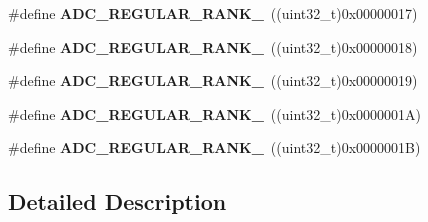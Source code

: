 \begin{DoxyCompactItemize}
\item 
\hypertarget{group___a_d_c__regular__rank_ga84301d64365a81385eec93a54a1b9c53}{\#define {\bfseries A\-D\-C\-\_\-\-R\-E\-G\-U\-L\-A\-R\-\_\-\-R\-A\-N\-K\-\_}~((uint32\-\_\-t)0x00000017)}\label{group___a_d_c__regular__rank_ga84301d64365a81385eec93a54a1b9c53}

\item 
\hypertarget{group___a_d_c__regular__rank_ga51119cb24537026fba397b0ba6a79a88}{\#define {\bfseries A\-D\-C\-\_\-\-R\-E\-G\-U\-L\-A\-R\-\_\-\-R\-A\-N\-K\-\_}~((uint32\-\_\-t)0x00000018)}\label{group___a_d_c__regular__rank_ga51119cb24537026fba397b0ba6a79a88}

\item 
\hypertarget{group___a_d_c__regular__rank_ga442b222dc33efbd2c6c2a725ac3a5a5e}{\#define {\bfseries A\-D\-C\-\_\-\-R\-E\-G\-U\-L\-A\-R\-\_\-\-R\-A\-N\-K\-\_}~((uint32\-\_\-t)0x00000019)}\label{group___a_d_c__regular__rank_ga442b222dc33efbd2c6c2a725ac3a5a5e}

\item 
\hypertarget{group___a_d_c__regular__rank_ga4acc0abe0e985a6d901624c98b5a7908}{\#define {\bfseries A\-D\-C\-\_\-\-R\-E\-G\-U\-L\-A\-R\-\_\-\-R\-A\-N\-K\-\_}~((uint32\-\_\-t)0x0000001\-A)}\label{group___a_d_c__regular__rank_ga4acc0abe0e985a6d901624c98b5a7908}

\item 
\hypertarget{group___a_d_c__regular__rank_ga1d07b3821871879fec05aef9a3f7f889}{\#define {\bfseries A\-D\-C\-\_\-\-R\-E\-G\-U\-L\-A\-R\-\_\-\-R\-A\-N\-K\-\_}~((uint32\-\_\-t)0x0000001\-B)}\label{group___a_d_c__regular__rank_ga1d07b3821871879fec05aef9a3f7f889}

\end{DoxyCompactItemize}


\subsection{Detailed Description}
